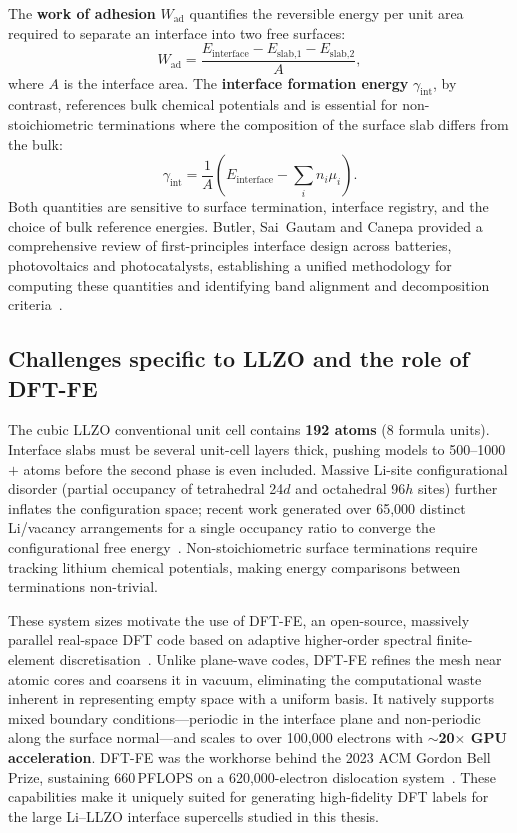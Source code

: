 \documentclass[12pt,a4paper,oneside]{book}
\begin{document}
The \textbf{work of adhesion} $W_\text{ad}$ quantifies the reversible energy per unit area required to separate an interface into two free surfaces:
\begin{equation}
  W_\text{ad} = \frac{E_\text{interface} - E_\text{slab,1} - E_\text{slab,2} }{A},
  \label{eq:Wad}
\end{equation}
where $A$ is the interface area. The \textbf{interface formation energy} $\gamma_\text{int}$, by contrast, references bulk chemical potentials and is essential for non-stoichiometric terminations where the composition of the surface slab differs from the bulk:
\begin{equation}
  \gamma_\text{int} = \frac{1}{A}\!\left(E_\text{interface} - \sum_i n_i \mu_i\right).
  \label{eq:gamma_int}
\end{equation}
Both quantities are sensitive to surface termination, interface registry, and the choice of bulk reference energies. Butler, Sai~Gautam and Canepa provided a comprehensive review of first-principles interface design across batteries, photovoltaics and photocatalysts, establishing a unified methodology for computing these quantities and identifying band alignment and decomposition criteria~\cite{Butler2019}.

\subsection{Challenges specific to LLZO and the role of DFT-FE}

The cubic LLZO conventional unit cell contains \textbf{192 atoms} (8 formula units). Interface slabs must be several unit-cell layers thick, pushing models to 500--1000$+$ atoms before the second phase is even included. Massive Li-site configurational disorder (partial occupancy of tetrahedral 24$d$ and octahedral 96$h$ sites) further inflates the configuration space; recent work generated over 65,000 distinct Li/vacancy arrangements for a single occupancy ratio to converge the configurational free energy~\cite{Baxter2024}. Non-stoichiometric surface terminations require tracking lithium chemical potentials, making energy comparisons between terminations non-trivial.

These system sizes motivate the use of DFT-FE, an open-source, massively parallel real-space DFT code based on adaptive higher-order spectral finite-element discretisation~\cite{Motamarri2020,Das2022}. Unlike plane-wave codes, DFT-FE refines the mesh near atomic cores and coarsens it in vacuum, eliminating the computational waste inherent in representing empty space with a uniform basis. It natively supports mixed boundary conditions---periodic in the interface plane and non-periodic along the surface normal---and scales to over 100,000 electrons with \textbf{$\sim$20$\times$ GPU acceleration}. DFT-FE was the workhorse behind the 2023 ACM Gordon Bell Prize, sustaining 660\,PFLOPS on a 620,000-electron dislocation system~\cite{Das2023gordon}. These capabilities make it uniquely suited for generating high-fidelity DFT labels for the large Li--LLZO interface supercells studied in this thesis.
\end{document}
